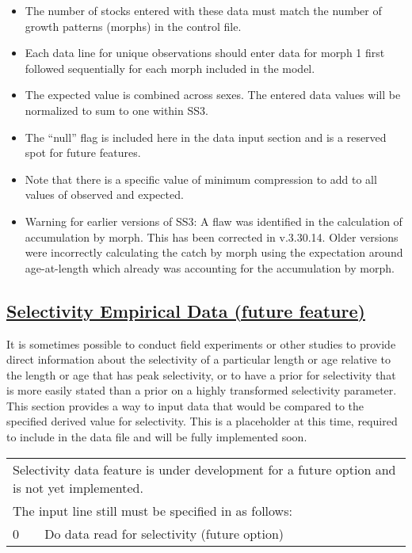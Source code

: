 	\begin{itemize}
		\item The number of stocks entered with these data must match the number of growth patterns (morphs) in the control file.
		\item Each data line for unique observations should enter data for morph 1 first followed sequentially for each morph included in the model.
		\item The expected value is combined across sexes. The entered data values will be normalized to sum to one within SS3.
		\item The ``null'' flag is included here in the data input section and is a reserved spot for future features. 
		\item Note that there is a specific value of minimum compression to add to all values of observed and expected.
		\item Warning for earlier versions of SS3: A flaw was identified in the calculation of accumulation by morph. This has been corrected in v.3.30.14. Older versions were incorrectly calculating the catch by morph using the expectation around age-at-length which already was accounting for the accumulation by morph.   
	\end{itemize}

\hypertarget{SelexEmperical}{}
\subsection[Selectivity Empirical Data (future feature)]{\protect\hyperlink{SelexEmperical}{Selectivity Empirical Data (future feature)}}
It is sometimes possible to conduct field experiments or other studies to provide direct information about the selectivity of a particular length or age relative to the length or age that has peak selectivity, or to have a prior for selectivity that is more easily stated than a prior on a highly transformed selectivity parameter. This section provides a way to input data that would be compared to the specified derived value for selectivity. This is a placeholder at this time, required to include in the data file and will be fully implemented soon.

\begin{center}
	\begin{tabular}{p{1cm} p{1.5cm} p{1.5cm} p{1.5cm} p{1.5cm} p{1.5cm} p{2.5cm} p{2.5cm} p{2.5cm}}
		\multicolumn{9}{l}{Selectivity data feature is under development for a future option and is not yet implemented.} \\
		\multicolumn{9}{l}{The input line still must be specified in as follows:} \\
		\hline
		0 & \multicolumn{8}{l}{Do data read for selectivity (future option)} \Tstrut\Bstrut\\
        \hline
	\end{tabular}
	\leavevmode\tagmcend\tagstructend\par
\end{center}

